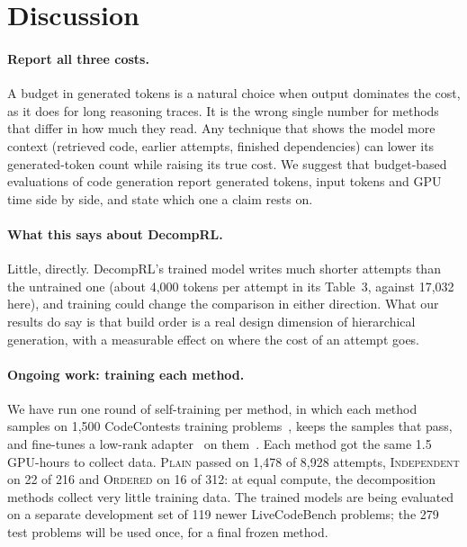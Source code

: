 \documentclass[11pt]{article}
\newcommand{\plain}{\textsc{Plain}}
\newcommand{\indep}{\textsc{Independent}}
\newcommand{\ordered}{\textsc{Ordered}}
\begin{document}
\section{Discussion}
\label{sec:discussion}

\paragraph{Report all three costs.} A budget in generated tokens is a natural choice when output dominates the cost,
as it does for long reasoning traces. It is the wrong single number for methods that differ in how much they read.
Any technique that shows the model more context (retrieved code, earlier attempts, finished dependencies) can lower
its generated-token count while raising its true cost. We suggest that budget-based evaluations of code generation
report generated tokens, input tokens and GPU time side by side, and state which one a claim rests on.

\paragraph{What this says about DecompRL.} Little, directly. DecompRL's trained model writes much shorter attempts
than the untrained one (about 4,000 tokens per attempt in its Table~3, against 17,032 here), and training could change
the comparison in either direction. What our results do say is that build order is a real design dimension of
hierarchical generation, with a measurable effect on where the cost of an attempt goes.

\paragraph{Ongoing work: training each method.} We have run one round of self-training per method, in which each
method samples on 1,500 CodeContests training problems~\citep{li2022alphacode}, keeps the samples that pass, and
fine-tunes a low-rank adapter~\citep{dettmers2023qlora} on them~\citep{zelikman2022star, yuan2023rft}. Each method
got the same 1.5 GPU-hours to collect data. \plain{} passed on 1,478 of 8,928 attempts, \indep{} on 22 of 216 and
\ordered{} on 16 of 312: at equal compute, the decomposition methods collect very little training data. The trained
models are being evaluated on a separate development set of 119 newer LiveCodeBench problems; the 279 test problems
will be used once, for a final frozen method.
\end{document}
